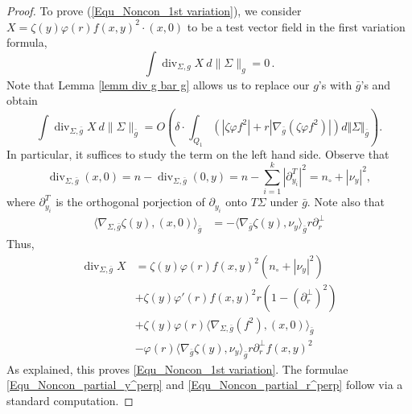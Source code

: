 \documentclass[11pt, letterpaper, reqno]{amsart}
\numberwithin{equation}{section}
\theoremstyle{remark}
\newcommand{\diverg}{\operatorname{div}}
\begin{document}
   \begin{proof}
    To prove (\ref{Equ_Noncon_1st variation}), we consider $X = \zeta(y)\varphi(r)f(x, y)^2\cdot (x, 0)$ to be a test vector field in the first variation formula,
    \[
     \int \diverg_{\Sigma,g} X \ d\|\Sigma\|_g = 0\,.
   \]
   Note that Lemma \ref{lemm div g bar g} allows us to replace our $g$'s with $\bar g$'s and obtain
   \[
     \int \diverg_{\Sigma,\bar g} X \ d\|\Sigma\|_{\bar g} = O\left( \delta \cdot \int_{Q_1} (  | \zeta\varphi f^2| + r |\nabla_{\bar g}(\zeta\varphi f^2)| ) d\Vert \Sigma\Vert_{\bar g} \right).
   \]
   In particular, it suffices to study the term on the left hand side. Observe that
\[
  \diverg_{\Sigma,\bar g} (x,0) = n - \diverg_{\Sigma,\bar g} (0, y)   = n - \sum_{i=1}^k |\partial_{y_i}^T|^2 = n_\circ + |\nu_y|^2,
\]
where $\partial^T_{y_i}$ is the orthogonal porjection of $\partial_{y_i}$ onto $T\Sigma$ under $\bar g$. Note also that
\begin{align*}
  \langle \nabla_{\Sigma,\bar g}\zeta(y)  ,(x,0) \rangle_{\bar g} & = - 
  \langle \nabla_{\bar g} \zeta(y), \nu_y \rangle_{\bar g} r \partial_r^\perp 
\end{align*}
Thus,
\begin{align*}
  \diverg_{\Sigma,\bar g} X & = \zeta(y)\varphi(r) f(x,y)^2 (n_\circ + |\nu_y|^2)\\
  & + \zeta(y) \varphi'(r)f(x,y)^2 r(1-(\partial_r^\perp)^2)\\
  & + \zeta(y)\varphi(r) \langle \nabla_{\Sigma,\bar g}(f^2),(x,0) \rangle_{\bar g} \\
  & - \varphi(r) \langle \nabla_{\bar g} \zeta(y),\nu_y \rangle_{\bar g} r \partial_r^\perp f(x,y)^2
\end{align*}
As explained, this proves \eqref{Equ_Noncon_1st variation}. The formulae \eqref{Equ_Noncon_partial_y^perp} and \eqref{Equ_Noncon_partial_r^perp} follow via a standard computation.
\end{proof}
\end{document}
